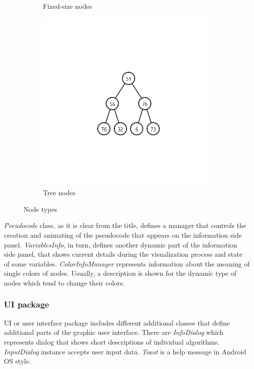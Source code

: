 \documentclass[
  field=inf,
  biblatex,
  language=english,
  glossaries,
  theorems=false,
  sourcecodes=false,
  index
]{kidiplom}
\begin{document}
\begin{figure}[H]
\begin{subfigure}{0.31\textwidth}
		\caption{Fixed-size nodes} \label{fig:1b}
	\end{subfigure}
	\hspace*{\fill} %
	\begin{subfigure}{0.31\textwidth}
		\includegraphics[width=\linewidth]{img/tree.png}
		\caption{Tree nodes} \label{fig:1c}
	\end{subfigure}
	\caption{Node types} \label{fig:1}
\end{figure}

\textit{Pseudocode} class, as it is clear from the title, defines a manager that controls the creation and animating of the pseudocode that appears on the information side panel. \textit{VariablesInfo}, in turn, defines another dynamic part of the information side panel, that shows current details during the visualization process and state of some variables. \textit{ColorInfoManager} represents information about the meaning of single colors of nodes. Usually, a description is shown for the dynamic type of nodes which tend to change their colors.

\subsubsection{UI package}
UI or user interface package includes different additional classes that define additional parts of the graphic user interface. There are \textit{InfoDialog} which represents dialog that shows short descriptions of individual algorithms. \textit{InputDialog} instance accepts user input data. \textit{Toast} is a help message in Android OS style.
\end{document}

